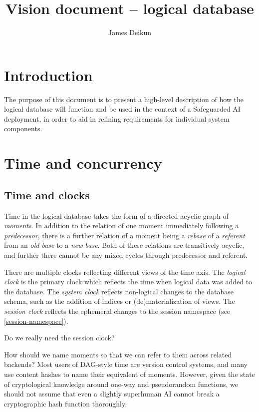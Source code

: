 \documentclass{article}
\title{Vision document -- logical database}
\author{James Deikun}
\begin{document}
\maketitle

\section{Introduction}

The purpose of this document is to present a high-level description of how the logical database will function and be used in the context of a Safeguarded AI deployment, in order to aid in refining requirements for individual system components.

\section{Time and concurrency}

\subsection{Time and clocks}

Time in the logical database takes the form of a directed acyclic graph of \emph{moments}.  In addition to the relation of one moment immediately following a \emph{predecessor}, there is a further relation of a moment being a \emph{rebase} of a \emph{referent} from an \emph{old base} to a \emph{new base}.  Both of these relations are transitively acyclic, and further there cannot be any mixed cycles through predecessor and referent.

There are multiple clocks reflecting different views of the time axis.  The \emph{logical clock} is the primary clock which reflects the time when logical data was added to the database.  The \emph{system clock} reflects non-logical changes to the database schema, such as the addition of indices or (de)materialization of views.  The \emph{session clock} reflects the ephemeral changes to the session namespace (see \cref{session-namespace}).

\begin{question}
	Do we really need the session clock?
\end{question}

\begin{question}
	How should we name moments so that we can refer to them across related backends?  Most users of DAG-style time are version control systems, and many use content hashes to name their equivalent of moments.  However, given the state of cryptological knowledge around one-way and pseudorandom functions, we should not assume that even a slightly superhuman AI cannot break a cryptographic hash function thoroughly.
\end{question}
\end{document}
